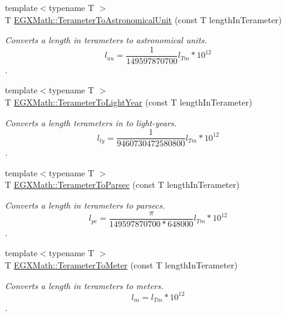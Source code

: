 \begin{DoxyCompactItemize}
\item 
{\footnotesize template$<$typename T $>$ }\\T \mbox{\hyperlink{group___e_g_x_math-_conversions-_length_conversions-_s_i-_terameter-_astronomical_gaddabc91d53862a8031cd5438aedb0ed2}{E\+G\+X\+Math\+::\+Terameter\+To\+Astronomical\+Unit}} (const T length\+In\+Terameter)
\begin{DoxyCompactList}\small\item\em Converts a length in terameters to astronomical units. \[ l_{au}= \frac{1}{149597870700} l_{Tm} * 10^{12} \]. \end{DoxyCompactList}\item 
{\footnotesize template$<$typename T $>$ }\\T \mbox{\hyperlink{group___e_g_x_math-_conversions-_length_conversions-_s_i-_terameter-_astronomical_gaf8f6953b6ef57246e02ab136d74ee7a8}{E\+G\+X\+Math\+::\+Terameter\+To\+Light\+Year}} (const T length\+In\+Terameter)
\begin{DoxyCompactList}\small\item\em Converts a length terameters in to light-\/years. \[ l_{ly}= \frac{1}{9460730472580800} l_{Tm} * 10^{12} \]. \end{DoxyCompactList}\item 
{\footnotesize template$<$typename T $>$ }\\T \mbox{\hyperlink{group___e_g_x_math-_conversions-_length_conversions-_s_i-_terameter-_astronomical_gac203b94b19db6ed8181e78413fafcf58}{E\+G\+X\+Math\+::\+Terameter\+To\+Parsec}} (const T length\+In\+Terameter)
\begin{DoxyCompactList}\small\item\em Converts a length in terameters to parsecs. \[ l_{pc}=\frac{\pi}{149597870700 * 648000} l_{Tm} * 10^{12} \]. \end{DoxyCompactList}\item 
{\footnotesize template$<$typename T $>$ }\\T \mbox{\hyperlink{group___e_g_x_math-_conversions-_length_conversions-_s_i-_terameter-_s_i_ga34f2674bfcf8fb79eda27adf607d0876}{E\+G\+X\+Math\+::\+Terameter\+To\+Meter}} (const T length\+In\+Terameter)
\begin{DoxyCompactList}\small\item\em Converts a length in terameters to meters. \[ l_{m}=l_{Tm} * 10^{12} \]. \end{DoxyCompactList}\item 

\end{DoxyCompactItemize}
